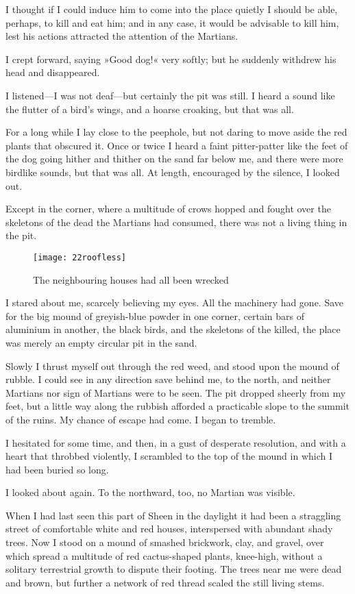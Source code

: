 I thought if I could induce him to come into the place quietly I should be able, perhaps, to kill and eat him; and in any case, it would be advisable to kill him, lest his actions attracted the attention of the Martians.

I crept forward, saying »Good dog!« very softly; but he suddenly withdrew his head and disappeared.

I listened—I was not deaf—but certainly the pit was still. I heard a sound like the flutter of a bird's wings, and a hoarse croaking, but that was all.

For a long while I lay close to the peephole, but not daring to move aside the red plants that obscured it. Once or twice I heard a faint pitter-patter like the feet of the dog going hither and thither on the sand far below me, and there were more birdlike sounds, but that was all. At length, encouraged by the silence, I looked out.

Except in the corner, where a multitude of crows hopped and fought over the skeletons of the dead the Martians had consumed, there was not a living thing in the pit.

\begin{figure}[tbp]
\centering
\texttt{[image: 22roofless]}
\caption{The neighbouring houses had all been wrecked}
\end{figure}

I stared about me, scarcely believing my eyes. All the machinery had gone. Save for the big mound of greyish-blue powder in one corner, certain bars of aluminium in another, the black birds, and the skeletons of the killed, the place was merely an empty circular pit in the sand.

Slowly I thrust myself out through the red weed, and stood upon the mound of rubble. I could see in any direction save behind me, to the north, and neither Martians nor sign of Martians were to be seen. The pit dropped sheerly from my feet, but a little way along the rubbish afforded a practicable slope to the summit of the ruins. My chance of escape had come. I began to tremble.

I hesitated for some time, and then, in a gust of desperate resolution, and with a heart that throbbed violently, I scrambled to the top of the mound in which I had been buried so long.

I looked about again. To the northward, too, no Martian was visible.

When I had last seen this part of Sheen in the daylight it had been a straggling street of comfortable white and red houses, interspersed with abundant shady trees. Now I stood on a mound of smashed brickwork, clay, and gravel, over which spread a multitude of red cactus-shaped plants, knee-high, without a solitary terrestrial growth to dispute their footing. The trees near me were dead and brown, but further a network of red thread scaled the still living stems.

